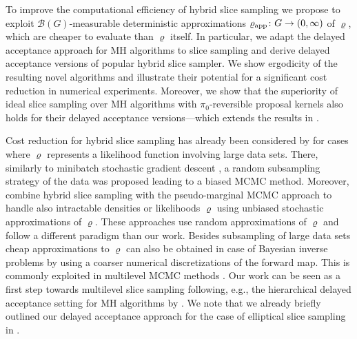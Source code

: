 \documentclass[sn-mathphys-num]{sn-jnl}%
\theoremstyle{thmstyleone}%
\theoremstyle{thmstyletwo}%
\theoremstyle{thmstylethree}%
\newcommand{\rhoapp}{\varrho_{{\rm app}}}
\begin{document}
To improve the computational efficiency of hybrid slice sampling we propose to exploit $\mathcal{B}(G)$-measurable deterministic approximations $\rhoapp\colon G \to (0,\infty)$ of $\varrho$, which are cheaper to evaluate than $\varrho$ itself.
In particular, we adapt the delayed acceptance approach for MH algorithms \cite{ChristenFox2005, BanterleEtAl2019} to slice sampling and derive delayed acceptance versions of popular hybrid slice sampler.
We show ergodicity of the resulting novel algorithms and illustrate their potential for a significant cost reduction in numerical experiments.
Moreover, we show that the superiority of ideal slice sampling over MH algorithms with $\pi_0$-reversible proposal kernels also holds for their delayed acceptance versions---which extends the results in \cite{RudolfUllrich2018}.

Cost reduction for hybrid slice sampling has already been considered by \citet{DuBoisEtAl2014} for cases where $\varrho$ represents a likelihood function involving large data sets.
There, similarly to minibatch stochastic gradient descent \cite{BottouEtAl2018}, a random subsampling strategy of the data was proposed leading to a biased MCMC method.
Moreover, \citet{MurrayGraham2016} combine hybrid slice sampling with the pseudo-marginal MCMC approach to handle also intractable densities or likelihoods $\varrho$ using unbiased stochastic approximations of $\varrho$.
These approaches use random approximations of $\varrho$ and follow a different paradigm than our work.
Besides subsampling of large data sets cheap approximations to $\varrho$ can also be obtained in case of Bayesian inverse problems by using a coarser numerical discretizations of the forward map.
This is commonly exploited in multilevel MCMC methods \cite{DodwellEtAl2019}.
Our work can be seen as a first step towards multilevel slice sampling following, e.g., the hierarchical delayed acceptance setting for MH algorithms by \citet{LykkegaardEtAl2022}.
We note that we already briefly outlined our delayed acceptance approach for the case of elliptical slice sampling in \cite{BitterlichEtAl2025}. 
\end{document}
